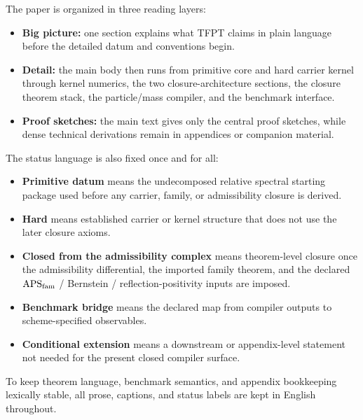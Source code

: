 The paper is organized in three reading layers:
\begin{itemize}[leftmargin=1.5em, topsep=3pt, itemsep=2pt]
    \item \textbf{Big picture:} one section explains what TFPT claims in plain language before the detailed datum and conventions begin.
    \item \textbf{Detail:} the main body then runs from primitive core and hard carrier kernel through kernel numerics, the two closure-architecture sections, the closure theorem stack, the particle/mass compiler, and the benchmark interface.
    \item \textbf{Proof sketches:} the main text gives only the central proof sketches, while dense technical derivations remain in appendices or companion material.
\end{itemize}
The status language is also fixed once and for all:
\begin{itemize}[leftmargin=1.5em, topsep=3pt, itemsep=2pt]
    \item \textbf{Primitive datum} means the undecomposed relative spectral starting package used before any carrier, family, or admissibility closure is derived.
    \item \textbf{Hard} means established carrier or kernel structure that does not use the later closure axioms.
    \item \textbf{Closed from the admissibility complex} means theorem-level closure once the admissibility differential, the imported family theorem, and the declared $\mathrm{APS}_{\mathrm{fam}}$ / Bernstein / reflection-positivity inputs are imposed.
    \item \textbf{Benchmark bridge} means the declared map from compiler outputs to scheme-specified observables.
    \item \textbf{Conditional extension} means a downstream or appendix-level statement not needed for the present closed compiler surface.
\end{itemize}
To keep theorem language, benchmark semantics, and appendix bookkeeping lexically stable, all prose, captions, and status labels are kept in English throughout.

